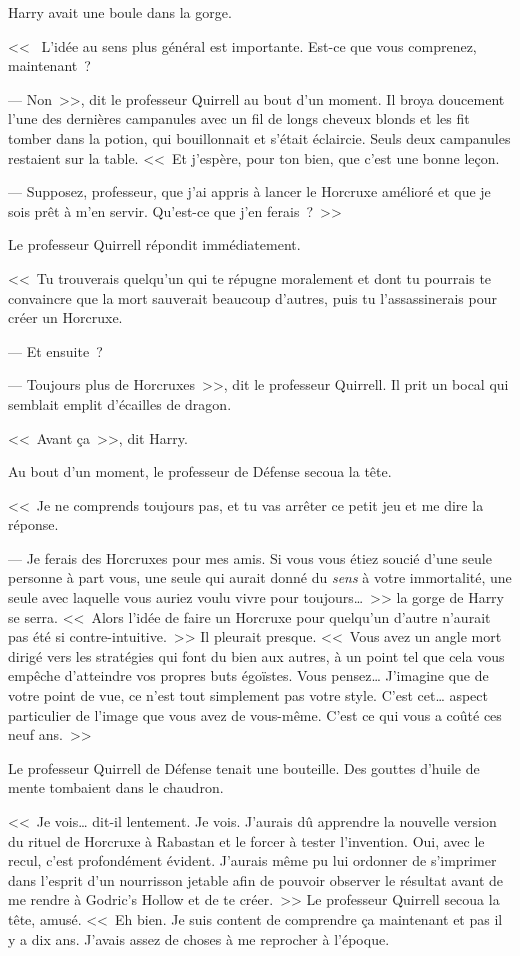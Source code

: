 Harry avait une boule dans la gorge.

<<~ L'idée au sens plus général est importante. Est-ce que vous comprenez, maintenant~?

--- Non~>>, dit le professeur Quirrell au bout d'un moment. Il broya doucement l'une des dernières campanules avec un fil de longs cheveux blonds et les fit tomber dans la potion, qui bouillonnait et s'était éclaircie. Seuls deux campanules restaient sur la table. <<~Et j'espère, pour ton bien, que c'est une bonne leçon.

--- Supposez, professeur, que j'ai appris à lancer le Horcruxe amélioré et que je sois prêt à m'en servir. Qu'est-ce que j'en ferais~?~>>

Le professeur Quirrell répondit immédiatement.

<<~Tu trouverais quelqu'un qui te répugne moralement et dont tu pourrais te convaincre que la mort sauverait beaucoup d'autres, puis tu l'assassinerais pour créer un Horcruxe.

--- Et ensuite~?

--- Toujours plus de Horcruxes~>>, dit le professeur Quirrell. Il prit un bocal qui semblait emplit d'écailles de dragon.

<<~Avant ça~>>, dit Harry.

Au bout d'un moment, le professeur de Défense secoua la tête.

<<~Je ne comprends toujours pas, et tu vas arrêter ce petit jeu et me dire la réponse.

--- Je ferais des Horcruxes pour mes amis. Si vous vous étiez soucié d'une seule personne à part vous, une seule qui aurait donné du \emph{sens} à votre immortalité, une seule avec laquelle vous auriez voulu vivre pour toujours…~>> la gorge de Harry se serra. <<~Alors l'idée de faire un Horcruxe pour quelqu'un d'autre n'aurait pas été si contre-intuitive.~>> Il pleurait presque. <<~Vous avez un angle mort dirigé vers les stratégies qui font du bien aux autres, à un point tel que cela vous empêche d'atteindre vos propres buts égoïstes. Vous pensez… J'imagine que de votre point de vue, ce n'est tout simplement pas votre style. C'est cet… aspect particulier de l'image que vous avez de vous-même. C'est ce qui vous a coûté ces neuf ans.~>>

Le professeur Quirrell de Défense tenait une bouteille. Des gouttes d'huile de mente tombaient dans le chaudron.

<<~Je vois… dit-il lentement. Je vois. J'aurais dû apprendre la nouvelle version du rituel de Horcruxe à Rabastan et le forcer à tester l'invention. Oui, avec le recul, c'est profondément évident. J'aurais même pu lui ordonner de s'imprimer dans l'esprit d'un nourrisson jetable afin de pouvoir observer le résultat avant de me rendre à Godric's Hollow et de te créer.~>> Le professeur Quirrell secoua la tête, amusé. <<~Eh bien. Je suis content de comprendre ça maintenant et pas il y a dix ans. J'avais assez de choses à me reprocher à l'époque.

